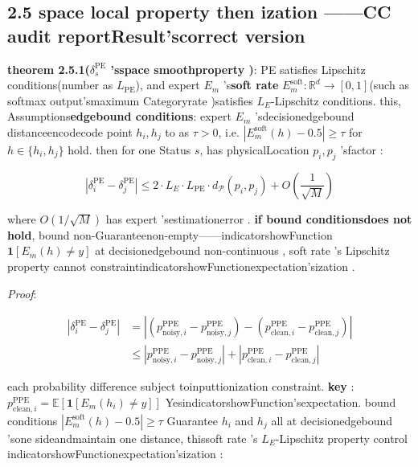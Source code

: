 \documentclass[
  12pt,
]{article}
\begin{document}
\subsection{2.5 space local property then ization ------CC
audit reportResult'scorrect version}\label{ux7a7aux95f4ux5c40ux90e8ux6027ux6b63ux5219ux5316cc-ux5ba1ux8ba1ux62a5ux544aux7ed3ux679cux7684ux4feeux6b63ux7248}

\textbf{theorem  2.5.1(\(\delta_s^{\text{PE}}\) 'sspace smoothproperty )}:  PE satisfies 
Lipschitz conditions(number as  \(L_{\text{PE}}\)), and expert  \(E_m\)
's\textbf{soft rate } \(E_m^{\text{soft}}: \mathbb{R}^d \to [0,1]\)(such as 
softmax output'smaximum Categoryrate )satisfies  \(L_E\)-Lipschitz
conditions. this, Assumptions\textbf{edgebound conditions}: expert  \(E_m\) 'sdecisionedgebound distanceencodecode point 
\(h_i, h_j\) to as  \(\tau > 0\), i.e.
\(|E_m^{\text{soft}}(h) - 0.5| \geq \tau\) for  \(h \in \{h_i, h_j\}\)
hold. then for one Status \(s\), has physicalLocation \(p_i, p_j\) 'sfactor : 

\[\boxed{|\delta_i^{\text{PE}} - \delta_j^{\text{PE}}| \leq 2 \cdot L_E \cdot L_{\text{PE}} \cdot d_{\mathcal{P}}(p_i, p_j) + O\left(\frac{1}{\sqrt{M}}\right)}\]

where \(O(1/\sqrt{M})\)
has expert 'sestimationerror . \textbf{if bound conditionsdoes not hold}, bound non-Guaranteenon-empty------indicatorshowFunction
\(\mathbf{1}[E_m(h) \neq y]\) at decisionedgebound non-continuous , soft rate 's Lipschitz
property cannot constraintindicatorshowFunctionexpectation'sization . 

\emph{Proof}: 

\begin{align*}
|\delta_i^{\text{PE}} - \delta_j^{\text{PE}}| &= |(p_{\text{noisy}, i}^{\text{PPE}} - p_{\text{noisy}, j}^{\text{PPE}}) - (p_{\text{clean}, i}^{\text{PPE}} - p_{\text{clean}, j}^{\text{PPE}})| \\
&\leq |p_{\text{noisy}, i}^{\text{PPE}} - p_{\text{noisy}, j}^{\text{PPE}}| + |p_{\text{clean}, i}^{\text{PPE}} - p_{\text{clean}, j}^{\text{PPE}}|
\end{align*}

each  probability difference
subject toinputtionization constraint. \textbf{key }: \(p_{\text{clean}, i}^{\text{PPE}} = \mathbb{E}[\mathbf{1}[E_m(h_i) \neq y]]\)
YesindicatorshowFunction'sexpectation. bound conditions \(|E_m^{\text{soft}}(h) - 0.5| \geq \tau\)
Guarantee \(h_i\) and  \(h_j\)
all at decisionedgebound 'sone sideandmaintain one distance, thissoft rate 's \(L_E\)-Lipschitz
property control indicatorshowFunctionexpectation'sization : 
\end{document}
